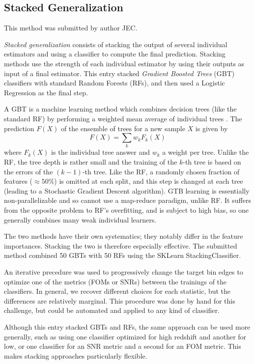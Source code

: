 \documentclass[twocolumn,twocolappendix]{aastex63}
\begin{document}
\subsection{ {\sc Stacked Generalization} } \label{sec:stackgen}
This method was submitted by author JEC.

\emph{Stacked generalization} consists of stacking the output of several individual estimators and 
using a classifier to compute the final prediction. Stacking methods use the strength of each 
individual estimator by using their outputs as input of a final estimator.  This entry stacked
\emph{Gradient Boosted Trees} (GBT) classifiers with standard Random Forests (RFs), and then used a Logistic 
Regression as the final step.

A GBT is a machine learning method which combines decision trees (like the standard RF)
by performing a weighted mean average of individual trees \citep{Friedman:2002we,RefWorks:1634}. 
The prediction $F(X)$ of the ensemble of trees for a new sample $X$ is given by
\begin{equation}
F(X) = \sum_k w_k F_k(X)
\end{equation}
where $F_k(X)$ is the individual tree answer and $w_k$ a weight per tree. Unlike the RF, the 
tree depth is rather small and the training  of the $k$-th tree is based on the errors of the
$(k-1)$-th tree.  Like the RF, a randomly chosen fraction of features ($\approx 50\%$) is 
omitted at each split, and this step is changed at each tree (leading to a Stochastic Gradient Descent 
algorithm).  GTB learning is essentially non-parallelizable and so cannot use a map-reduce paradigm, 
unlike RF. It suffers from the opposite problem to RF's overfitting, and is subject
to high bias, so one generally combines many weak individual learners.

The two methods have their own systematics; they notably differ in the feature importances. Stacking 
the two is therefore especially effective.  The submitted method combined 50 GBTs with
50 RFs using the {\sc SKLearn} {\sc StackingClassifier}.

An iterative precedure was used to progressively change the target bin edges to optimize one of the metrics (FOMs or SNRs) between the trainings of the classifiers. In general, we recover different choices for each statistic, but the differences are relatively marginal. This procedure was done by hand for this challenge, but could be automated and applied to any kind of classifier.

Although this entry stacked GBTs and RFs, the same approach can be used more generally, such as using
one classifier optimized for high redshift and another for low, or one classifier for an SNR metric
and a second for an FOM metric.  This makes stacking approaches particularly flexible.
\end{document}
